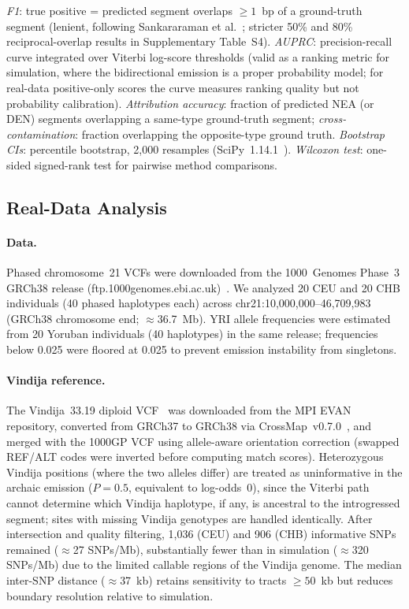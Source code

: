 \emph{F1}: true positive = predicted segment overlaps $\geq 1$~bp of a ground-truth segment
(lenient, following Sankararaman et al.~\citeyear{sankararaman2014genomic};
stricter 50\% and 80\% reciprocal-overlap results in Supplementary Table~S4).
\emph{AUPRC}: precision-recall curve integrated over Viterbi log-score thresholds
(valid as a ranking metric for simulation, where the bidirectional emission is a
proper probability model; for real-data positive-only scores the curve measures
ranking quality but not probability calibration).
\emph{Attribution accuracy}: fraction of predicted NEA (or DEN) segments overlapping
a same-type ground-truth segment; \emph{cross-contamination}: fraction overlapping
the opposite-type ground truth.
\emph{Bootstrap CIs}: percentile bootstrap, 2{,}000 resamples (SciPy~1.14.1~\citep{virtanen2020scipy}).
\emph{Wilcoxon test}: one-sided signed-rank test for pairwise method comparisons.

\subsection*{Real-Data Analysis}

\paragraph{Data.}
Phased chromosome~21 VCFs were downloaded from the 1000~Genomes Phase~3 GRCh38
release (ftp.1000genomes.ebi.ac.uk)~\citep{genomes20151000}.
We analyzed 20 CEU and 20 CHB individuals (40 phased haplotypes each)
across chr21:10,000,000--46,709,983 (GRCh38 chromosome end; $\approx$36.7~Mb).
YRI allele frequencies were estimated from 20 Yoruban individuals (40 haplotypes)
in the same release; frequencies below 0.025 were floored at 0.025 to prevent
emission instability from singletons.

\paragraph{Vindija reference.}
The Vindija~33.19 diploid VCF~\citep{prufer2017high} was downloaded from the
MPI EVAN repository, converted from GRCh37 to GRCh38 via CrossMap~v0.7.0~\citep{zhao2014crossmap},
and merged with the 1000GP VCF using allele-aware orientation correction
(swapped REF/ALT codes were inverted before computing match scores).
Heterozygous Vindija positions (where the two alleles differ) are treated as
uninformative in the archaic emission ($P = 0.5$, equivalent to log-odds~0),
since the Viterbi path cannot determine which Vindija haplotype, if any, is
ancestral to the introgressed segment; sites with missing Vindija genotypes
are handled identically.
After intersection and quality filtering, 1{,}036 (CEU) and 906 (CHB) informative
SNPs remained ($\approx$27 SNPs/Mb), substantially fewer than in simulation
($\approx$320 SNPs/Mb) due to the limited callable regions of the Vindija genome.
The median inter-SNP distance ($\approx$37~kb) retains sensitivity to tracts
$\geq 50$~kb but reduces boundary resolution relative to simulation.

